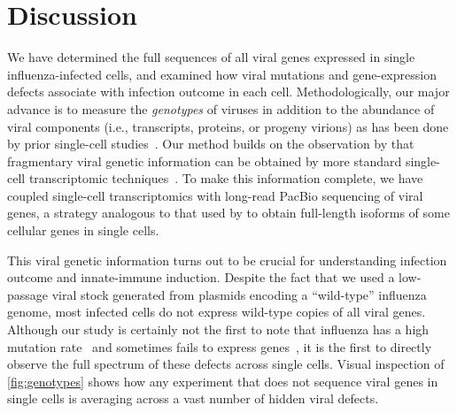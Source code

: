 \documentclass[10pt,letterpaper]{article}
\newcommand{\FIG}[1]{\autoref{fig:#1}}
\begin{document}
\section*{Discussion}
We have determined the full sequences of all viral genes expressed in single influenza-infected cells, and examined how viral mutations and gene-expression defects associate with infection outcome in each cell.
Methodologically, our major advance is to measure the \emph{genotypes} of viruses in addition to the abundance of viral components (i.e., transcripts, proteins, or progeny virions) as has been done by prior single-cell studies~\cite{russell2018extreme, zanini2018single, zanini2018virus, steuerman2018dissection, saikia2018simultaneous, oneal2018west, zhu2009growth, schulte2014single, akpinar2016high, heldt2015single, brooke2013most}.
Our method builds on the observation by that fragmentary viral genetic information can be obtained by more standard single-cell transcriptomic techniques~\cite{saikia2018simultaneous, zanini2018virus}.
To make this information complete, we have coupled single-cell transcriptomics with long-read PacBio sequencing of viral genes, a strategy analogous to that used by \cite{gupta2018single} to obtain full-length isoforms of some cellular genes in single cells.

This viral genetic information turns out to be crucial for understanding infection outcome and innate-immune induction.
Despite the fact that we used a low-passage viral stock generated from plasmids encoding a ``wild-type'' influenza genome, most infected cells do not express wild-type copies of all viral genes.
Although our study is certainly not the first to note that influenza has a high mutation rate~\cite{parvin1986measurement, suarez1992heterogeneity, suarez1994estimation, bloom2014experimentally, pauly2017novel} and sometimes fails to express genes~\cite{brooke2013most, heldt2015single, dou2017analysis, russell2018extreme}, it is the first to directly observe the full spectrum of these defects across single cells.
Visual inspection of \FIG{genotypes} shows how any experiment that does not sequence viral genes in single cells is averaging across a vast number of hidden viral defects.
\end{document}
